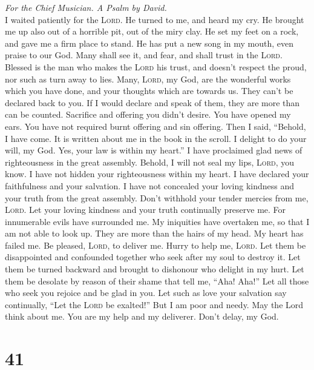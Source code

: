 \emph{For the Chief Musician. A Psalm by David.}\\
 I waited patiently for the \textsc{Lord}. He turned to
me, and heard my cry.  He brought me up also out of a
horrible pit, out of the miry clay. He set my feet on a rock, and gave
me a firm place to stand.  He has put a new song in my
mouth, even praise to our God. Many shall see it, and fear, and shall
trust in the \textsc{Lord}.  Blessed is the man who makes
the \textsc{Lord} his trust, and doesn't respect the proud, nor such as
turn away to lies.  Many, \textsc{Lord}, my God, are the
wonderful works which you have done, and your thoughts which are towards
us. They can't be declared back to you. If I would declare and speak of
them, they are more than can be counted.  Sacrifice and
offering you didn't desire. You have opened my ears. You have not
required burnt offering and sin offering.  Then I said,
``Behold, I have come. It is written about me in the book in the scroll.
 I delight to do your will, my God. Yes, your law is
within my heart.''  I have proclaimed glad news of
righteousness in the great assembly. Behold, I will not seal my lips,
\textsc{Lord}, you know.  I have not hidden your
righteousness within my heart. I have declared your faithfulness and
your salvation. I have not concealed your loving kindness and your truth
from the great assembly.  Don't withhold your tender
mercies from me, \textsc{Lord}. Let your loving kindness and your truth
continually preserve me.  For innumerable evils have
surrounded me. My iniquities have overtaken me, so that I am not able to
look up. They are more than the hairs of my head. My heart has failed
me.  Be pleased, \textsc{Lord}, to deliver me. Hurry to
help me, \textsc{Lord}.  Let them be disappointed and
confounded together who seek after my soul to destroy it. Let them be
turned backward and brought to dishonour who delight in my hurt.
 Let them be desolate by reason of their shame that tell
me, ``Aha! Aha!''  Let all those who seek you rejoice and
be glad in you. Let such as love your salvation say continually, ``Let
the \textsc{Lord} be exalted!''  But I am poor and needy.
May the Lord think about me. You are my help and my deliverer. Don't
delay, my God.

\hypertarget{section-40}{%
\section{41}\label{section-40}}

